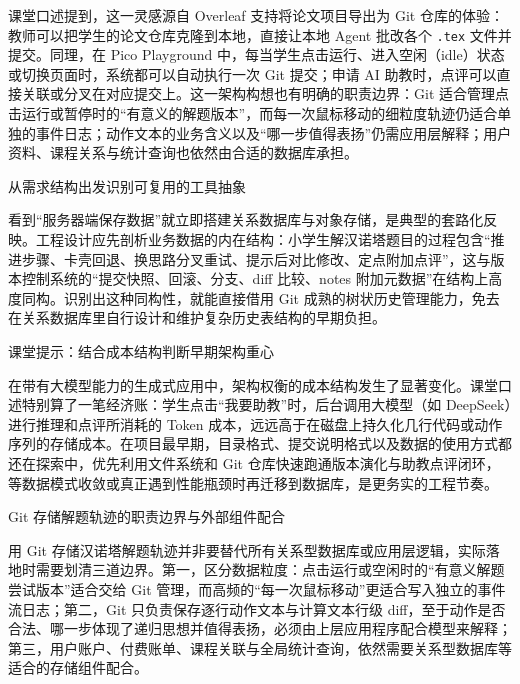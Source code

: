 \documentclass[UTF8,a4paper,11pt,fontset=fandol]{ctexart}
\begin{document}
课堂口述提到，这一灵感源自 Overleaf 支持将论文项目导出为 Git 仓库的体验：教师可以把学生的论文仓库克隆到本地，直接让本地 Agent 批改各个 \texttt{.tex} 文件并提交。同理，在 Pico Playground 中，每当学生点击运行、进入空闲（idle）状态或切换页面时，系统都可以自动执行一次 Git 提交；申请 AI 助教时，点评可以直接关联或分叉在对应提交上。这一架构构想也有明确的职责边界：Git 适合管理点击运行或暂停时的“有意义的解题版本”，而每一次鼠标移动的细粒度轨迹仍适合单独的事件日志；动作文本的业务含义以及“哪一步值得表扬”仍需应用层解释；用户资料、课程关系与统计查询也依然由合适的数据库承担。

\begin{importantbox}{从需求结构出发识别可复用的工具抽象}

看到“服务器端保存数据”就立即搭建关系数据库与对象存储，是典型的套路化反映。工程设计应先剖析业务数据的内在结构：小学生解汉诺塔题目的过程包含“推进步骤、卡壳回退、换思路分叉重试、提示后对比修改、定点附加点评”，这与版本控制系统的“提交快照、回滚、分支、diff 比较、notes 附加元数据”在结构上高度同构。识别出这种同构性，就能直接借用 Git 成熟的树状历史管理能力，免去在关系数据库里自行设计和维护复杂历史表结构的早期负担。

\end{importantbox}

\begin{knowledgebox}{课堂提示：结合成本结构判断早期架构重心}

在带有大模型能力的生成式应用中，架构权衡的成本结构发生了显著变化。课堂口述特别算了一笔经济账：学生点击“我要助教”时，后台调用大模型（如 DeepSeek）进行推理和点评所消耗的 Token 成本，远远高于在磁盘上持久化几行代码或动作序列的存储成本。在项目最早期，目录格式、提交说明格式以及数据的使用方式都还在探索中，优先利用文件系统和 Git 仓库快速跑通版本演化与助教点评闭环，等数据模式收敛或真正遇到性能瓶颈时再迁移到数据库，是更务实的工程节奏。

\end{knowledgebox}

\begin{warningbox}{Git 存储解题轨迹的职责边界与外部组件配合}

用 Git 存储汉诺塔解题轨迹并非要替代所有关系型数据库或应用层逻辑，实际落地时需要划清三道边界。第一，区分数据粒度：点击运行或空闲时的“有意义解题尝试版本”适合交给 Git 管理，而高频的“每一次鼠标移动”更适合写入独立的事件流日志；第二，Git 只负责保存逐行动作文本与计算文本行级 diff，至于动作是否合法、哪一步体现了递归思想并值得表扬，必须由上层应用程序配合模型来解释；第三，用户账户、付费账单、课程关联与全局统计查询，依然需要关系型数据库等适合的存储组件配合。

\end{warningbox}
\end{document}
